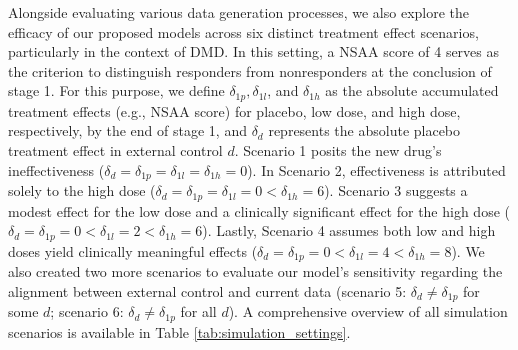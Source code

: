 Alongside evaluating various data generation processes, we also explore the efficacy of our proposed models across six distinct treatment effect scenarios, particularly in the context of \ac{DMD}. In this setting, a \ac{NSAA} score of 4 serves as the criterion to distinguish responders from nonresponders at the conclusion of stage 1. For this purpose, we define \(\delta_{1p}, \delta_{1l}\), and \(\delta_{1h}\) as the absolute accumulated treatment effects (e.g., \ac{NSAA} score) for placebo, low dose, and high dose, respectively, by the end of stage 1, and \(\delta_{d}\) represents the absolute placebo treatment effect in external control \(d\). Scenario 1 posits the new drug's ineffectiveness (\(\delta_{d} = \delta_{1p} = \delta_{1l} = \delta_{1h} = 0\)). In Scenario 2, effectiveness is attributed solely to the high dose (\(\delta_{d} = \delta_{1p} = \delta_{1l} = 0 < \delta_{1h} = 6\)). Scenario 3 suggests a modest effect for the low dose and a clinically significant effect for the high dose (\(\delta_{d} = \delta_{1p} = 0 < \delta_{1l} = 2 < \delta_{1h} = 6\)). Lastly, Scenario 4 assumes both low and high doses yield clinically meaningful effects (\(\delta_{d} = \delta_{1p} = 0 < \delta_{1l} = 4 < \delta_{1h} = 8\)). We also created two more scenarios to evaluate our model's sensitivity regarding the alignment between external control and current data (scenario 5: \(\delta_d \ne \delta_{1p}\) for some \(d\); scenario 6: \(\delta_d \ne \delta_{1p}\) for all \(d\)). A comprehensive overview of all simulation scenarios is available in Table \ref{tab:simulation_settings}.

